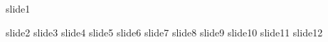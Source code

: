 \documentclass[unknownkeysallowed]{beamer}
\begin{document}

\begin{frame}
  \titlepage
\end{frame}

{slide1}

{slide2}
{slide3}
{slide4}
{slide5}
{slide6}
{slide7}
{slide8}
{slide9}
{slide10}
{slide11}
{slide12}


\begin{frame}[allowframebreaks]

  \printbibliography

\end{frame}



\end{document}
